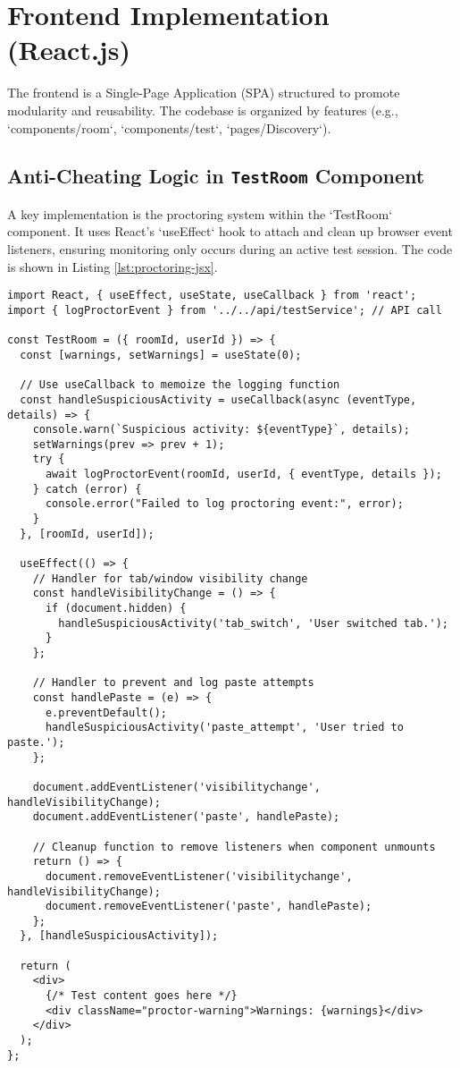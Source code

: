 \section{Frontend Implementation (React.js)}
\label{sec:impl-frontend}
The frontend is a Single-Page Application (SPA) structured to promote modularity and reusability. The codebase is organized by features (e.g., `components/room`, `components/test`, `pages/Discovery`).

\subsection{Anti-Cheating Logic in \texttt{TestRoom} Component}
A key implementation is the proctoring system within the `TestRoom` component. It uses React's `useEffect` hook to attach and clean up browser event listeners, ensuring monitoring only occurs during an active test session. The code is shown in Listing \ref{lst:proctoring-jsx}.
\FloatBarrier
\begin{lstlisting}[language=JSX, caption={Simplified anti-cheating logic in the `TestRoom` React component.}, label={lst:proctoring-jsx}]
import React, { useEffect, useState, useCallback } from 'react';
import { logProctorEvent } from '../../api/testService'; // API call

const TestRoom = ({ roomId, userId }) => {
  const [warnings, setWarnings] = useState(0);

  // Use useCallback to memoize the logging function
  const handleSuspiciousActivity = useCallback(async (eventType, details) => {
    console.warn(`Suspicious activity: ${eventType}`, details);
    setWarnings(prev => prev + 1);
    try {
      await logProctorEvent(roomId, userId, { eventType, details });
    } catch (error) {
      console.error("Failed to log proctoring event:", error);
    }
  }, [roomId, userId]);

  useEffect(() => {
    // Handler for tab/window visibility change
    const handleVisibilityChange = () => {
      if (document.hidden) {
        handleSuspiciousActivity('tab_switch', 'User switched tab.');
      }
    };

    // Handler to prevent and log paste attempts
    const handlePaste = (e) => {
      e.preventDefault();
      handleSuspiciousActivity('paste_attempt', 'User tried to paste.');
    };
    
    document.addEventListener('visibilitychange', handleVisibilityChange);
    document.addEventListener('paste', handlePaste);

    // Cleanup function to remove listeners when component unmounts
    return () => {
      document.removeEventListener('visibilitychange', handleVisibilityChange);
      document.removeEventListener('paste', handlePaste);
    };
  }, [handleSuspiciousActivity]);

  return (
    <div>
      {/* Test content goes here */}
      <div className="proctor-warning">Warnings: {warnings}</div>
    </div>
  );
};
\end{lstlisting}

